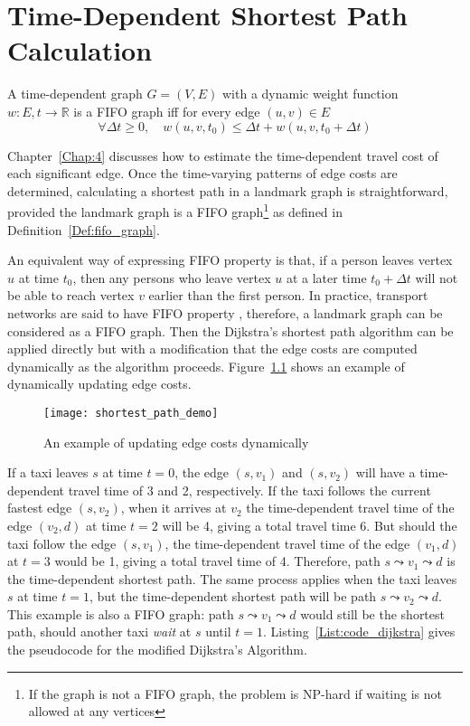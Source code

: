 \chapter{Time-Dependent Shortest Path Calculation}\label{Chap:5}

\begin{defn}\label{Def:fifo_graph}
A time-dependent graph $G=(V,E)$ with a dynamic weight function $w : E,t \rightarrow \mathbb{R}$ is a FIFO graph \cite{TDS08} iff for every edge $(u, v) \in E$
\begin{equation}
\forall \Delta t \geq 0, \quad w(u, v, t_{0}) \leq \Delta t + w(u, v, t_{0} + \Delta t)
\end{equation}
\end{defn}

Chapter~\ref{Chap:4} discusses how to estimate the time-dependent travel cost of each signi\-ficant edge. Once the time-varying patterns of edge costs are determined, calculating a shortest path in a landmark graph is straightforward, provided the landmark graph is a FIFO graph\footnote{If the graph is not a FIFO graph, the problem is NP-hard if waiting is not allowed at any vertices} as defined in Definition~\ref{Def:fifo_graph}. 

An equivalent way of expressing FIFO property is that, if a person leaves vertex $u$ at time $t_{0}$, then any persons who leave vertex $u$ at a later time $t_{0} + \Delta t$ will not be able to reach vertex $v$ earlier than the first person. In practice, transport networks are said to have FIFO property \cite{TDR10}, therefore, a landmark graph can be considered as a FIFO graph. Then the Dijkstra's shortest path algorithm can be applied directly but with a modification that the edge costs are computed dynamically as the algorithm proceeds. Figure~\ref{Fig:dynamic_update} shows an example of dynamically updating edge costs. 

\begin{figure}[h!]
\texttt{[image: shortest\_path\_demo]}
\centering
\caption{An example of updating edge costs dynamically}\label{Fig:dynamic_update}
\end{figure}

If a taxi leaves $s$ at time $t = 0$, the edge $(s, v_{1})$ and $(s, v_{2})$ will have a time-dependent travel time of 3 and 2, respectively. If the taxi follows the current fastest edge $(s, v_{2})$, when it arrives at $v_{2}$ the time-dependent travel time of the edge $(v_{2}, d)$ at time $t = 2$ will be 4, giving a total travel time 6. But should the taxi follow the edge $(s, v_{1})$, the time-dependent travel time of the edge $(v_{1}, d)$ at $t = 3$ would be 1, giving a total travel time of 4. Therefore, path $s \leadsto v_{1} \leadsto d$ is the time-dependent shortest path. The same process applies when the taxi leaves $s$ at time $t = 1$, but the time-dependent shortest path will be path $s \leadsto v_{2} \leadsto d$. This example is also a FIFO graph: path $s \leadsto v_{1} \leadsto d$ would still be the shortest path, should another taxi \emph{wait} at $s$ until $t = 1$. Listing~\ref{List:code_dijkstra} gives the pseudocode for the modified Dijkstra's Algorithm. 

